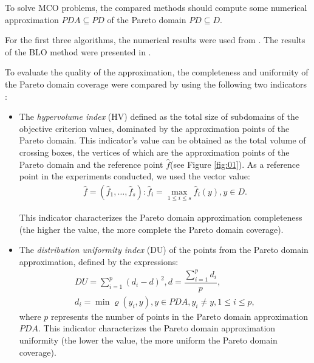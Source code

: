\documentclass[smallcondensed]{svjour3}     %
\begin{document}
To solve MCO problems, the compared methods should compute some numerical approximation $PDA \subseteq PD$ of the Pareto domain $PD \subseteq D$.\par

For the first three algorithms, the numerical results were used from \cite{c10}. The results of the BLO method were presented in \cite{c45}. \par

To evaluate the quality of the approximation, the completeness and uniformity of the Pareto domain coverage were compared by using the following two indicators \cite{c10,c46}:
\begin{itemize}
	\item The {\it hypervolume index} (HV) defined as the total size of subdomains of the objective criterion values, dominated by the approximation points of the Pareto domain. This indicator's value can be obtained as the total volume of crossing boxes, the vertices of which are the approximation points of the Pareto domain and the reference point $\hat{f}$(see Figure \ref{fig:01}).  As a reference point in the experiments conducted, we used the vector value:
\begin{eqnarray*}
 \hat{f}=(\hat{f}_1,\dots,\hat{f}_s):\hat{f}_i=\max_{1 \leq i \leq s} {\hat{f}_i(y), y \in D}.
\end{eqnarray*}

This indicator characterizes the Pareto domain approximation completeness (the higher the value, the more complete the Pareto domain coverage).
	
	\item The {\it distribution uniformity index} (DU) of the points from the Pareto domain approximation, defined by the expressions:
\begin{equation*}
\begin{matrix}
DU=\sum_{i=1}^p{(d_i-d)^2} , d=\dfrac{ \sum_{i=1}^p{d_i} }{p}, \\
d_i=\min {\varrho(y_i,y)}, y \in PDA, y_i \neq y, 1 \leq i \leq p,
\end{matrix}
\end{equation*}
where $p$ represents the number of points in the Pareto domain approximation $PDA$. This indicator characterizes the Pareto domain approximation uniformity (the lower the value, the more uniform the Pareto domain coverage).
\end{itemize}
	
\end{document}
